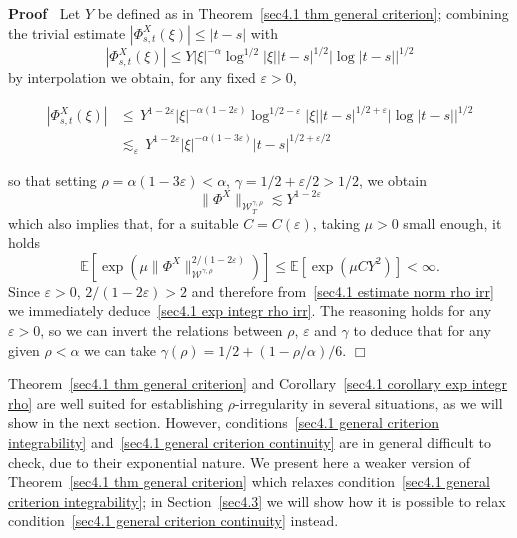 \documentclass[10pt]{article}
\newenvironment{proof}{\noindent\textbf{Proof\ }}{\hspace*{\fill}$\Box$\medskip}
\begin{document}
\begin{proof}
  Let $Y$ be defined as in Theorem~\ref{sec4.1 thm general criterion};
  combining the trivial estimate $| \Phi^X_{s, t} (\xi) | \leqslant | t - s |$
  with
  \[ | \Phi^X_{s, t} (\xi) | \leqslant Y | \xi |^{- \alpha} \log^{1 / 2} |
     \xi |  | t - s |^{1 / 2}  | \log | t - s | |^{1 / 2} \]
  by interpolation we obtain, for any fixed $\varepsilon > 0$,
  
  \begin{align}
    | \Phi^X_{s, t} (\xi) | & \leqslant \, Y^{1 - 2 \varepsilon}  | \xi |^{-
    \alpha (1 - 2 \varepsilon)} \log^{1 / 2 - \varepsilon} | \xi |  | t - s
    |^{1 / 2 + \varepsilon}  | \log | t - s | |^{1 / 2}\\
    & \lesssim_{\varepsilon} \, Y^{1 - 2 \varepsilon} | \xi |^{- \alpha (1 -
    3 \varepsilon)}  | t - s |^{1 / 2 + \varepsilon / 2}
  \end{align}
  
  so that setting $\rho = \alpha (1 - 3 \varepsilon) < \alpha$, $\gamma = 1 /
  2 + \varepsilon / 2 > 1 / 2$, we obtain
  \[ \| \Phi^X \|_{\mathcal{W}^{\gamma, \rho}_T} \lesssim Y^{1 - 2
     \varepsilon} \]
  which also implies that, for a suitable $C = C (\varepsilon)$, taking $\mu >
  0$ small enough, it holds
  \begin{equation}
    \mathbb{E} [\exp (\mu \| \Phi^X \|_{\mathcal{W}^{\gamma, \rho}}^{2 / (1 -
    2 \varepsilon)})] \leqslant \mathbb{E} [\exp (\mu C Y^2)] < \infty .
    \label{sec4.1 estimate norm rho irr}
  \end{equation}
  Since $\varepsilon > 0$, $2 / (1 - 2 \varepsilon) > 2$ and therefore
  from~{\eqref{sec4.1 estimate norm rho irr}} we immediately
  deduce~{\eqref{sec4.1 exp integr rho irr}}. The reasoning holds for any
  $\varepsilon > 0$, so we can invert the relations between $\rho$,
  $\varepsilon$ and $\gamma$ to deduce that for any given $\rho < \alpha$ we
  can take $\gamma (\rho) = 1 / 2 + (1 - \rho / \alpha) / 6$.
\end{proof}

Theorem~\ref{sec4.1 thm general criterion} and Corollary~\ref{sec4.1 corollary
exp integr rho} are well suited for establishing $\rho$\mbox{-}irregularity in
several situations, as we will show in the next section. However,
conditions~{\eqref{sec4.1 general criterion integrability}} and~{\eqref{sec4.1
general criterion continuity}} are in general difficult to check, due to their
exponential nature. We present here a weaker version of Theorem~\ref{sec4.1
thm general criterion} which relaxes condition~{\eqref{sec4.1 general
criterion integrability}}; in Section~\ref{sec4.3} we will show how it is
possible to relax condition~{\eqref{sec4.1 general criterion continuity}}
instead.
\end{document}
